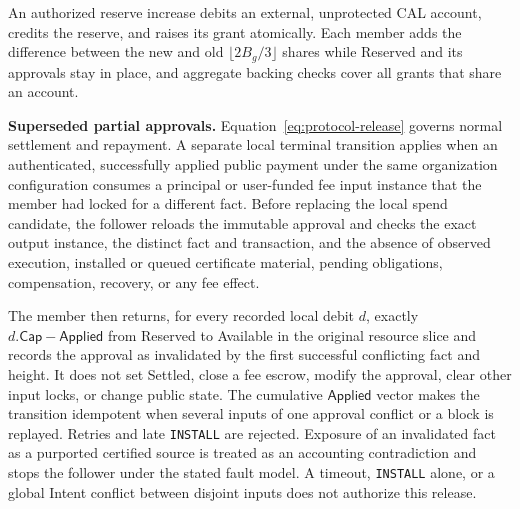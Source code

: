 An authorized reserve increase debits an external, unprotected CAL account, credits the reserve, and raises its grant atomically. Each member adds the difference between the new and old $\lfloor2B_g/3\rfloor$ shares while Reserved and its approvals stay in place, and aggregate backing checks cover all grants that share an account.

\noindent\textbf{Superseded partial approvals.}
Equation~\eqref{eq:protocol-release} governs normal settlement and
repayment.  A separate local terminal transition applies when an
authenticated, successfully applied public payment under the same
organization configuration consumes a principal or user-funded fee
input instance that the member had locked for a different fact.
Before replacing the local spend candidate, the follower reloads the
immutable approval and checks the exact output instance, the distinct
fact and transaction, and the absence of observed execution, installed
or queued certificate material, pending obligations, compensation,
recovery, or any fee effect.

The member then returns, for every recorded local debit $d$, exactly
$d.\mathsf{Cap}-\mathsf{Applied}$ from Reserved to Available in the
original resource slice and records the approval as invalidated by the
first successful conflicting fact and height.  It does not set
\textsf{Settled}, close a fee escrow, modify the approval, clear other
input locks, or change public state.  The cumulative
$\mathsf{Applied}$ vector makes the transition idempotent when several
inputs of one approval conflict or a block is replayed. Retries and late
\texttt{INSTALL} are rejected. Exposure of an invalidated fact as a
purported certified source is treated as an accounting contradiction
and stops the follower under the stated fault model.
A timeout, \texttt{INSTALL} alone, or a global Intent
conflict between disjoint inputs does not authorize this release.
